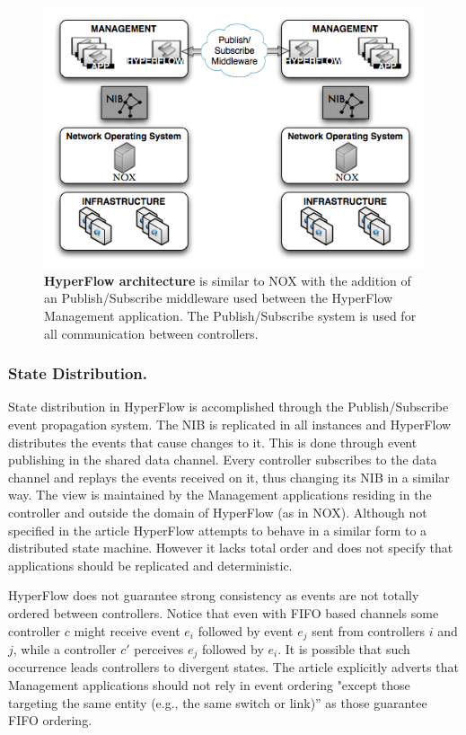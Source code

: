 \begin{figure}
  \centering 
  \footnotesize
  \includegraphics[scale=0.5]{pic/hyperflow-design.png}
  \caption[HyperFlow architecture]{\textbf{HyperFlow architecture} is  similar to
    NOX  with the addition of an Publish/Subscribe middleware
    used between the HyperFlow Management application. The
    Publish/Subscribe system is used for all communication between controllers.}
  \label{fig:hyperflow-design}
\end{figure}


\subsubsection{State Distribution.} State distribution in HyperFlow is accomplished through the
Publish/Subscribe event propagation system. The NIB  is
replicated in all instances and HyperFlow distributes the events
that cause changes to it. This is done through event publishing in the shared
data channel. Every controller subscribes to the
data channel and replays the events received on it, thus changing its
NIB in a similar way.  The view  is maintained by the Management applications
residing in the controller and outside the domain of
HyperFlow (as in NOX). Although not specified in the article HyperFlow attempts to
behave in a similar form to a distributed state machine. However it
lacks total order and does not specify that applications should be
replicated and deterministic. 

HyperFlow does not guarantee strong
consistency as events are not totally ordered  between controllers. 
Notice that even with FIFO based channels some controller $c$ might receive event $e_i$ followed by event
$e_j$ sent from controllers $i$ and $j$, while a controller $c'$
perceives $e_j$ followed by $e_i$. It is possible that such occurrence
leads controllers to divergent states. The article explicitly adverts
that Management applications should not rely in event ordering "except
those targeting the same entity (e.g., the same switch or link)'' as
those guarantee FIFO ordering. 

